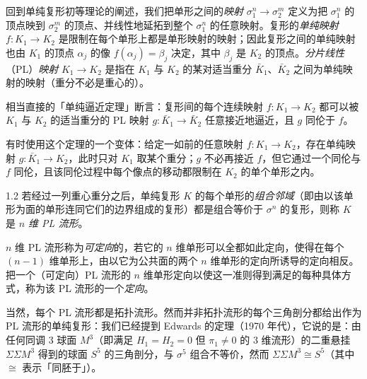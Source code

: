 回到单纯复形初等理论的阐述，我们把单形之间的\emph{映射} $\sigma_1^n\to\sigma_2^m$ 定义为把 $\sigma_1^n$ 的顶点映到 $\sigma_2^m$ 的顶点、并线性地延拓到整个 $\sigma_1^n$ 的任意映射。复形的\emph{单纯映射} $f:K_1\to K_2$ 是限制在每个单形上都是单形映射的映射；因此复形之间的单纯映射也由 $K_1$ 的顶点 $\alpha_j$ 的像 $f(\alpha_j)=\beta_j$ 决定，其中 $\beta_j$ 是 $K_2$ 的顶点。\emph{分片线性}（PL）\emph{映射} $K_1\to K_2$ 是指在 $K_1$ 与 $K_2$ 的某对适当重分 $\bar K_1$、$\bar K_2$ 之间为单纯映射的映射（重分不必是重心的）。

相当直接的「单纯逼近定理」断言：复形间的每个连续映射 $f:K_1\to K_2$ 都可以被 $K_1$ 与 $K_2$ 的适当重分的 PL 映射 $g:\bar K_1\to\bar K_2$ 任意接近地逼近，且 $g$ 同伦于 $f$。

有时使用这个定理的一个变体：给定一如前的任意映射 $f:K_1\to K_2$，存在单纯映射 $g:\bar K_1\to K_2$，此时只对 $K_1$ 取某个重分；$g$ 不必再接近 $f$，但它通过一个同伦与 $f$ 同伦，且该同伦过程中每个像点的移动都限制在 $K_2$ 的单个单形之内。

\begin{definition*}{1.2}
若经过一列重心重分之后，单纯复形 $K$ 的每个单形的\emph{组合邻域}（即由以该单形为面的单形连同它们的边界组成的复形）都是组合等价于 $\sigma^n$ 的复形，则称 $K$ 是 \emph{$n$ 维 PL 流形}。
\end{definition*}

$n$ 维 PL 流形称为\emph{可定向}的，若它的 $n$ 维单形可以全都如此定向，使得在每个 $(n-1)$ 维单形上，由以它为公共面的两个 $n$ 维单形的定向所诱导的定向相反。把一个（可定向）PL 流形的 $n$ 维单形定向以使这一准则得到满足的每种具体方式，称为该 PL 流形的一个\emph{定向}。

当然，每个 PL 流形都是拓扑流形。然而并非拓扑流形的每个三角剖分都给出作为 PL 流形的单纯复形：我们已经提到 Edwards 的定理（1970 年代），它说的是：由任何同调 3 球面 $M^3$（即满足 $H_1=H_2=0$ 但 $\pi_1\ne0$ 的 3 维流形）的二重悬挂 $\Sigma\Sigma M^3$ 得到的球面 $S^5$ 的三角剖分，与 $\sigma^5$ 组合不等价，然而 $\Sigma\Sigma M^3\cong S^5$（其中 $\cong$ 表示「同胚于」）。

